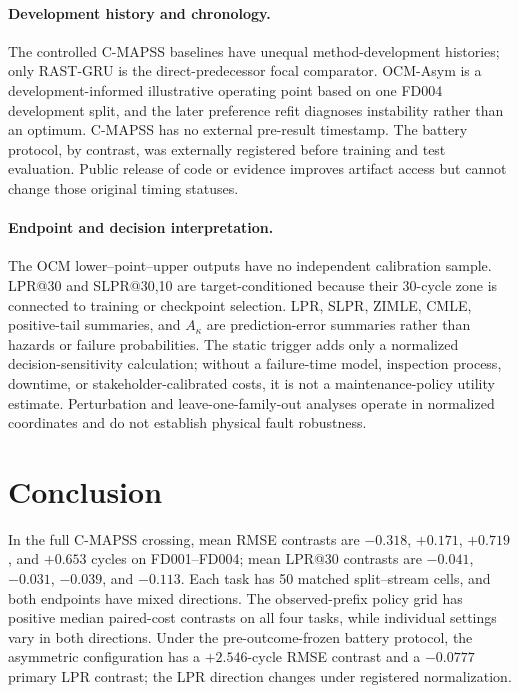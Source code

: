 \documentclass[preprint,12pt,numbers,sort&compress]{elsarticle}
\begin{document}
\paragraph{Development history and chronology.}
The controlled C-MAPSS baselines have unequal method-development histories; only RAST-GRU is the direct-predecessor focal comparator. OCM-Asym is a development-informed illustrative operating point based on one FD004 development split, and the later preference refit diagnoses instability rather than an optimum. C-MAPSS has no external pre-result timestamp. The battery protocol, by contrast, was externally registered before training and test evaluation. Public release of code or evidence improves artifact access but cannot change those original timing statuses.


\paragraph{Endpoint and decision interpretation.}
The OCM lower--point--upper outputs have no independent calibration sample. LPR@30 and SLPR@30,10 are target-conditioned because their 30-cycle zone is connected to training or checkpoint selection. LPR, SLPR, ZIMLE, CMLE, positive-tail summaries, and $A_\kappa$ are prediction-error summaries rather than hazards or failure probabilities. The static trigger adds only a normalized decision-sensitivity calculation; without a failure-time model, inspection process, downtime, or stakeholder-calibrated costs, it is not a maintenance-policy utility estimate. Perturbation and leave-one-family-out analyses operate in normalized coordinates and do not establish physical fault robustness.

\section{Conclusion}

In the full C-MAPSS crossing, mean RMSE contrasts are $-0.318$, $+0.171$, $+0.719$, and $+0.653$ cycles on FD001--FD004; mean LPR@30 contrasts are $-0.041$, $-0.031$, $-0.039$, and $-0.113$. Each task has 50 matched split--stream cells, and both endpoints have mixed directions. The observed-prefix policy grid has positive median paired-cost contrasts on all four tasks, while individual settings vary in both directions. Under the pre-outcome-frozen battery protocol, the asymmetric configuration has a $+2.546$-cycle RMSE contrast and a $-0.0777$ primary LPR contrast; the LPR direction changes under registered normalization.
\end{document}
